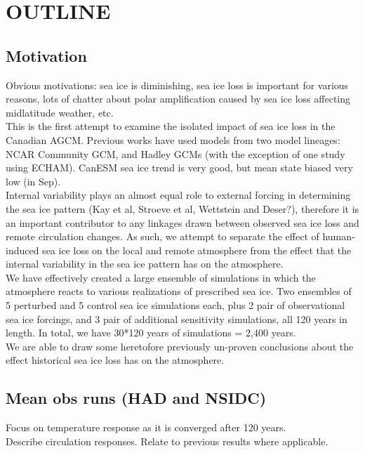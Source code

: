 \documentclass[twocol]{ametsoc}
\begin{document}

\section{OUTLINE}

\subsection{Motivation}

Obvious motivations: sea ice is diminishing, sea ice loss is important for various reasons, lots of chatter about polar amplification caused by sea ice loss affecting midlatitude weather, etc.\\
This is the first attempt to examine the isolated impact of sea ice loss in the Canadian AGCM. Previous works have used models from two model lineages: NCAR Community GCM, and Hadley GCMs (with the exception of one study using ECHAM). CanESM sea ice trend is very good, but mean state biased very low (in Sep).\\
Internal variability plays an almost equal role to external forcing in determining the sea ice pattern (Kay et al, Stroeve et al, Wettstein and Deser?), therefore it is an important contributor to any linkages drawn between observed sea ice loss and remote circulation changes. As such, we attempt to separate the effect of human-induced sea ice loss on the local and remote atmosphere from the effect that the internal variability in the sea ice pattern has on the atmosphere.\\
We have effectively created a large ensemble of simulations in which the atmosphere reacts to various realizations of prescribed sea ice. Two ensembles of 5 perturbed and 5 control sea ice simulations each, plus 2 pair of observational sea ice forcings, and 3 pair of additional sensitivity simulations, all 120 years in length. In total, we have 30*120 years of simulations = 2,400 years.\\
We are able to draw some heretofore previously un-proven conclusions about the effect historical sea ice loss has on the atmosphere.

\subsection{Mean obs runs (HAD and NSIDC)}
Focus on temperature response as it is converged after 120 years.\\
Describe circulation responses. Relate to previous results where applicable.\\
\end{document}
